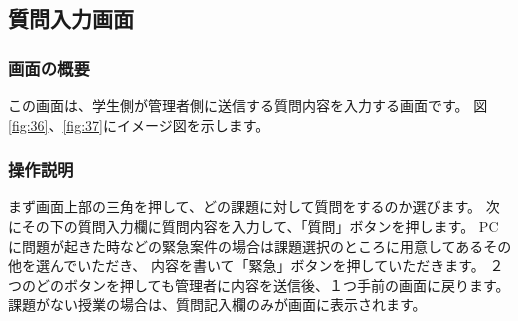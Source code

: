 \newpage



\subsection{質問入力画面}
\subsubsection{画面の概要}
この画面は、学生側が管理者側に送信する質問内容を入力する画面です。
図\ref{fig:36}、\ref{fig:37}にイメージ図を示します。

\subsubsection{操作説明}
まず画面上部の三角を押して、どの課題に対して質問をするのか選びます。
次にその下の質問入力欄に質問内容を入力して、「質問」ボタンを押します。
PCに問題が起きた時などの緊急案件の場合は課題選択のところに用意してあるその他を選んでいただき、
内容を書いて「緊急」ボタンを押していただきます。
２つのどのボタンを押しても管理者に内容を送信後、１つ手前の画面に戻ります。
課題がない授業の場合は、質問記入欄のみが画面に表示されます。


